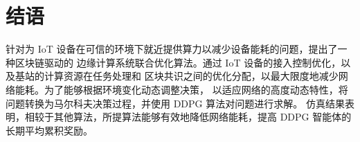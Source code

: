 \section{结语}

针对为 IoT 设备在可信的环境下就近提供算力以减少设备能耗的问题，提出了一种区块链驱动的
边缘计算系统联合优化算法。通过 IoT 设备的接入控制优化，以及基站的计算资源在任务处理和
区块共识之间的优化分配，以最大限度地减少网络能耗。为了能够根据环境变化动态调整决策，
以适应网络的高度动态特性，将问题转换为马尔科夫决策过程，并使用 DDPG 算法对问题进行求解。
仿真结果表明，相较于其他算法，所提算法能够有效地降低网络能耗，提高 DDPG 智能体的
长期平均累积奖励。
